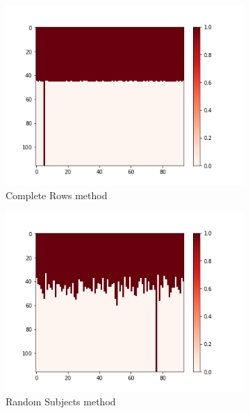 \documentclass[10pt, conference, compsocconf]{IEEEtran}
\begin{document}
\begin{figure}[h!]
\begin{subfigure}[b]{0.4\linewidth}
  		\includegraphics[width=\columnwidth]{figures/5vs7_rows_04_training}
  		\caption{Complete Rows method}
  		\label{fig:Rows-Sample-Training-set}
	\end{subfigure}
	\begin{subfigure}[b]{0.4\linewidth}
 		\includegraphics[width=\columnwidth]{figures/5vs7_random-real_04_training}
		\caption{Random Subjects method}
  		\label{fig:Uniform-S-Sample-Training-set}
	\end{subfigure}
	\begin{subfigure}[b]{0.4\linewidth}

\end{subfigure}
\end{figure}
\end{document}
